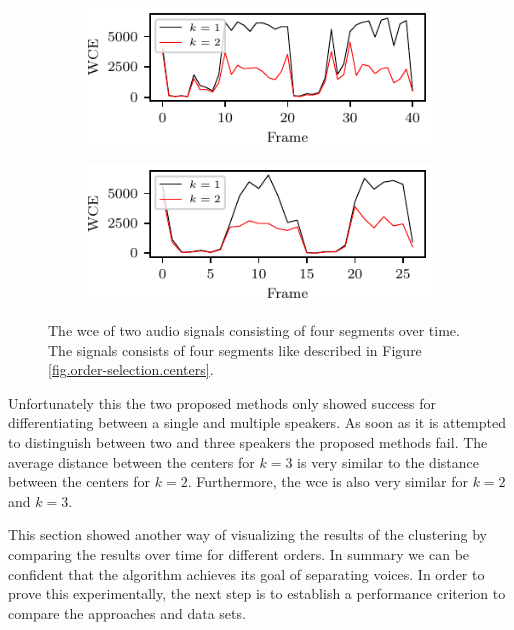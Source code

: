 \begin{figure}[ht]
	\begin{subfigure}[t]{0.48\textwidth}
		\centering
		\includegraphics{figure/elbow/scores_1.pdf}
	\end{subfigure}
	\begin{subfigure}[t]{0.48\textwidth}
		\centering
		\includegraphics{figure/elbow/scores_2.pdf}
	\end{subfigure}%
	\caption{The \gls{wce} of two audio signals consisting of four segments over time. The signals consists of four segments like described in Figure \ref{fig.order-selection.centers}.}
	\label{fig.order-selection.scores}
\end{figure}

Unfortunately this the two proposed methods only showed success for differentiating between a single and multiple speakers. As soon as it is attempted to distinguish between two and three speakers the proposed methods fail. The average distance between the centers for $k=3$ is very similar to the distance between the centers for $k=2$. Furthermore, the \gls{wce} is also very similar for $k=2$ and $k=3$.

This section showed another way of visualizing the results of the clustering by comparing the results over time for different orders. In summary we can be confident that the algorithm achieves its goal of separating voices. 
In order to prove this experimentally, the next step is to establish a performance criterion to compare the approaches and data sets.

